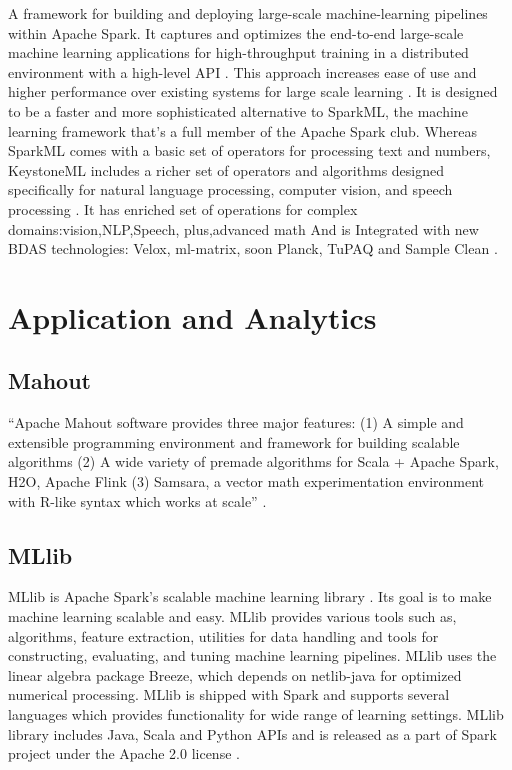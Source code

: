     A framework for building and deploying large-scale
    machine-learning pipelines within Apache Spark. It captures and
    optimizes the end-to-end large-scale machine learning applications
    for high-throughput training in a distributed environment with a
    high-level API \cite{sparks2016keystoneml}. This approach
    increases ease of use and higher performance over existing systems
    for large scale learning \cite{sparks2016keystoneml}. It is
    designed to be a faster and more sophisticated alternative to
    SparkML, the machine learning framework that’s a full member of
    the Apache Spark club. Whereas SparkML comes with a basic set of
    operators for processing text and numbers, KeystoneML includes a
    richer set of operators and algorithms designed specifically for
    natural language processing, computer vision, and speech
    processing \cite{building}. It has enriched set of operations for
    complex domains:vision,NLP,Speech, plus,advanced math And is
    Integrated with new BDAS technologies: Velox, ml-matrix, soon
    Planck, TuPAQ and Sample Clean \cite{spark}.

\section{Application and Analytics}
\label{S:o-application}

\subsection{Mahout}

    ``Apache Mahout software provides three major features:
    (1) A simple and extensible programming environment and framework
    for building scalable algorithms
    (2) A wide variety of premade algorithms for Scala + Apache Spark,
    H2O, Apache Flink
    (3) Samsara, a vector math experimentation environment with R-like
    syntax which works at scale'' \cite{www-mahout}.

    \pv


\subsection{MLlib}

    MLlib is Apache Spark’s scalable machine learning library
    \cite{www-mllib}. Its goal is to make machine learning scalable
    and easy. MLlib provides various tools such as, algorithms,
    feature extraction, utilities for data handling and tools for
    constructing, evaluating, and tuning machine learning
    pipelines. MLlib uses the linear algebra package Breeze, which
    depends on netlib-java for optimized numerical processing. MLlib
    is shipped with Spark and supports several languages which
    provides functionality for wide range of learning settings. MLlib
    library includes Java, Scala and Python APIs and is released as a
    part of Spark project under the Apache 2.0 license
    \cite{MLlib-article}.

